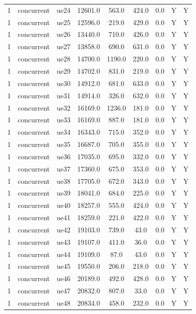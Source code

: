 \begin{table}[ht]
\begin{tabular}{|c|c|c|c|c|c|c|c|c|}
1 & concurrent & ue24 & 12601.0 & 563.0 & 424.0 & 0.0 & Y & Y \\
1 & concurrent & ue25 & 12596.0 & 219.0 & 429.0 & 0.0 & Y & Y \\
1 & concurrent & ue26 & 13440.0 & 710.0 & 426.0 & 0.0 & Y & Y \\
1 & concurrent & ue27 & 13858.0 & 690.0 & 631.0 & 0.0 & Y & Y \\
1 & concurrent & ue28 & 14700.0 & 1190.0 & 220.0 & 0.0 & Y & Y \\
1 & concurrent & ue29 & 14702.0 & 831.0 & 219.0 & 0.0 & Y & Y \\
1 & concurrent & ue30 & 14912.0 & 681.0 & 633.0 & 0.0 & Y & Y \\
1 & concurrent & ue31 & 14914.0 & 326.0 & 632.0 & 0.0 & Y & Y \\
1 & concurrent & ue32 & 16169.0 & 1236.0 & 181.0 & 0.0 & Y & Y \\
1 & concurrent & ue33 & 16169.0 & 887.0 & 181.0 & 0.0 & Y & Y \\
1 & concurrent & ue34 & 16343.0 & 715.0 & 352.0 & 0.0 & Y & Y \\
1 & concurrent & ue35 & 16687.0 & 705.0 & 355.0 & 0.0 & Y & Y \\
1 & concurrent & ue36 & 17035.0 & 695.0 & 332.0 & 0.0 & Y & Y \\
1 & concurrent & ue37 & 17360.0 & 675.0 & 353.0 & 0.0 & Y & Y \\
1 & concurrent & ue38 & 17705.0 & 672.0 & 343.0 & 0.0 & Y & Y \\
1 & concurrent & ue39 & 18041.0 & 684.0 & 225.0 & 0.0 & Y & Y \\
1 & concurrent & ue40 & 18257.0 & 555.0 & 424.0 & 0.0 & Y & Y \\
1 & concurrent & ue41 & 18259.0 & 221.0 & 422.0 & 0.0 & Y & Y \\
1 & concurrent & ue42 & 19103.0 & 739.0 & 43.0 & 0.0 & Y & Y \\
1 & concurrent & ue43 & 19107.0 & 411.0 & 36.0 & 0.0 & Y & Y \\
1 & concurrent & ue44 & 19109.0 & 87.0 & 43.0 & 0.0 & Y & Y \\
1 & concurrent & ue45 & 19550.0 & 206.0 & 218.0 & 0.0 & Y & Y \\
1 & concurrent & ue46 & 20189.0 & 492.0 & 428.0 & 0.0 & Y & Y \\
1 & concurrent & ue47 & 20832.0 & 807.0 & 33.0 & 0.0 & Y & Y \\
1 & concurrent & ue48 & 20834.0 & 458.0 & 232.0 & 0.0 & Y & Y \\

\end{tabular}
\end{table}
